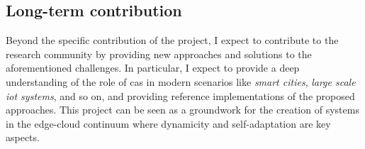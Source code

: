 \documentclass[12pt,a4paper]{article}
\begin{document}

\subsection{Long-term contribution}
Beyond the specific contribution of the project,
I expect to contribute to the research community by providing new approaches and solutions to the aforementioned challenges.
%
In particular,
I expect to provide a deep understanding of the role of \ac{cas} in modern scenarios like \emph{smart cities}, \emph{large scale \ac{iot} systems}, and so on,
and providing reference implementations of the proposed approaches.
%
This project can be seen as a groundwork for the creation of systems in the edge-cloud continuum where dynamicity and self-adaptation are key aspects.

\printbibliography
\end{document}
